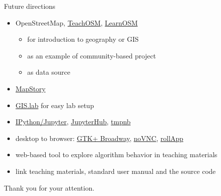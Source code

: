 \documentclass[xcolor={dvipsnames,usenames},beamer]{beamer}
\begin{document}
\begin{frame}{Future directions}

\begin{itemize}
 \item OpenStreetMap,
    \href{http://teachosm.org}{TeachOSM}, \href{http://learnosm.org}{LearnOSM}
 \begin{itemize}
  \item for introduction to geography or GIS
  \item as an example of community-based project
  \item as data source
 \end{itemize}
 \item \href{http://mapstory.org/}{MapStory}
 \item \href{http://imincik.github.io/gis-lab/}{GIS.lab} {\scriptsize for easy lab setup}
 \item \href{http://jupyter.org/}{IPython/Jupyter},
    \href{https://github.com/jupyter/jupyterhub}{JupyterHub},
    \href{https://github.com/jupyter/tmpnb}{tmpnb}
 \item
    desktop to browser:
    \href{https://developer.gnome.org/gtk3/stable/gtk-broadway.html}{GTK+ Broadway},
    \href{https://kanaka.github.io/noVNC/}{noVNC},
    \href{https://www.rollapp.com/}{rollApp}
 \item web-based tool to explore algorithm behavior in teaching materials
 \item link teaching materials, standard user manual and the source code
\end{itemize}

\end{frame}

\begin{frame}{}

Thank you for your attention.

\end{frame}
\end{document}
